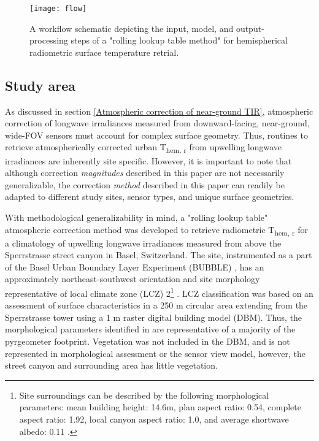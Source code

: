 \begin{bibunit}
\begin{figure}[!ht]
	\texttt{[image: flow]}
	\caption{A workflow schematic depicting the input, model, and output-processing steps of a "rolling lookup table method" for hemispherical radiometric surface temperature retrial.}
	\label{flow}
\end{figure}

\subsection{Study area}

As discussed in section \ref{Atmospheric correction of near-ground TIR}, atmospheric correction of longwave irradiances measured from downward-facing, near-ground, wide-FOV sensors must account for complex surface geometry. Thus, routines to retrieve atmospherically corrected urban T\textsubscript{hem, r} from upwelling longwave irradiances are inherently site specific. However, it is important to note that although correction \textit{magnitudes} described in this paper are not necessarily generalizable, the correction \textit{method} described in this paper can readily be adapted to different study sites, sensor types, and unique surface geometries.

With methodological generalizability in mind, a "rolling lookup table" atmospheric correction method was developed to retrieve radiometric T\textsubscript{hem, r} for a climatology of upwelling longwave irradiances measured from above the Sperrstrasse street canyon in Basel, Switzerland. The site, instrumented as a part of the Basel Urban Boundary Layer Experiment (BUBBLE) \cite{Rotach2005}, has an approximately northeast-southwest orientation and site morphology representative of local climate zone (LCZ) 2\footnote{Site surroundings can be described by the following morphological parameters: mean building height: 14.6m, plan aspect ratio: 0.54, complete aspect ratio: 1.92, local canyon aspect ratio: 1.0, and average shortwave albedo: 0.11 \cite{Rotach2005}.} \cite{Stewart2012}. LCZ classification was based on an assessment of surface characteristics in a 250 \si{\meter} circular area extending from the Sperrstrasse tower using a 1 \si{m} raster digital building model (DBM). Thus, the morphological parameters identified in \cite{Rotach2005} are representative of a majority of the pyrgeometer footprint. Vegetation was not included in the DBM, and is not represented in morphological assessment or the sensor view model, however, the street canyon and surrounding area has little vegetation.


\end{bibunit}
